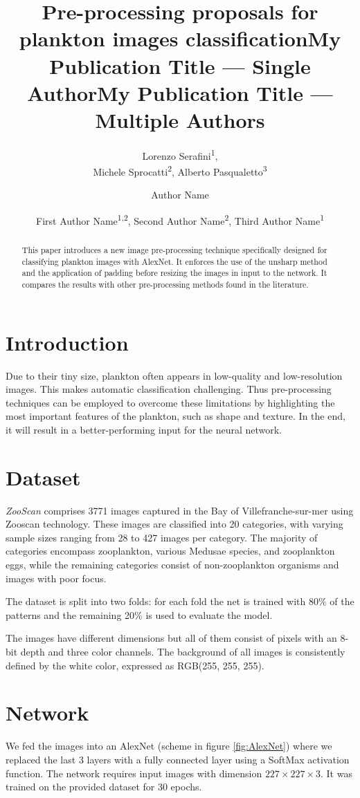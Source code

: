 \documentclass[letterpaper]{article} %
\title{Pre-processing proposals for plankton images classification}
\author{
    Lorenzo Serafini\textsuperscript{\rm 1},\\
    Michele Sprocatti\textsuperscript{\rm 2}, %
    Alberto Pasqualetto\textsuperscript{\rm 3} %
}
\title{My Publication Title --- Single Author}
\author {
    Author Name
}
\title{My Publication Title --- Multiple Authors}
\author {
    First Author Name\textsuperscript{\rm 1,\rm 2},
    Second Author Name\textsuperscript{\rm 2},
    Third Author Name\textsuperscript{\rm 1}
}
\begin{document}
\nocopyright

\maketitle

\begin{abstract}
This paper introduces a new image pre-processing technique specifically designed for classifying plankton images with AlexNet.
It enforces the use of the unsharp method and the application of padding before resizing the images in input to the network. It compares the results with other pre-processing methods found in the literature.
\end{abstract}


\section{Introduction} \label{sec:introduction}
Due to their tiny size, plankton often appears in low-quality and low-resolution images. This makes automatic classification challenging.
Thus pre-processing techniques can be employed to overcome these limitations by highlighting the most important features of the plankton, such as shape and texture. In the end, it will result in a better-performing input for the neural network.


\section{Dataset} \label{sec:dataset}
\textit{ZooScan} \cite{digitalZooplanktonGorsky2010} comprises 3771 images captured in the Bay of Villefranche-sur-mer using Zooscan technology. These images are classified into 20 categories, with varying sample sizes ranging from 28 to 427 images per category. The majority of categories encompass zooplankton, various Medusae species, and zooplankton eggs, while the remaining categories consist of non-zooplankton organisms and images with poor focus.

The dataset is split into two folds: for each fold the net is trained with 80\% of the patterns and the remaining 20\% is used to evaluate the model.

The images have different dimensions but all of them consist of pixels with an 8-bit depth and three color channels.
The background of all images is consistently defined by the white color, expressed as RGB(255, 255, 255).


\section{Network} \label{sec:network}
We fed the images into an AlexNet (scheme in figure \ref{fig:AlexNet}) where we replaced the last 3 layers with a fully connected layer using a SoftMax activation function.
The network requires input images with dimension $227 \times 227 \times 3$. It was trained on the provided dataset for 30 epochs.
\end{document}
